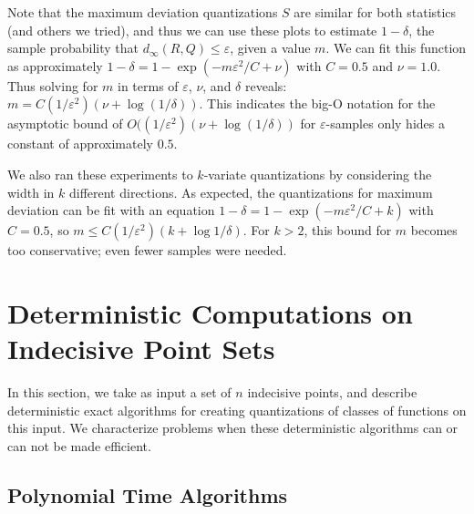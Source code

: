 \documentclass{journal}
\newcommand{\eps}{\varepsilon}
\begin{document}
Note that the maximum deviation quantizations $S$ are similar for both statistics (and others we tried), and thus we can use these plots to estimate $1-\delta$, the sample probability that $d_\infty(R,Q) \leq \eps$, given a value $m$.  We can fit this function as approximately $1-\delta = 1-\exp(-m \eps^2 / C + \nu)$ with $C=0.5$ and $\nu=1.0$.  Thus solving for $m$ in terms of $\eps$, $\nu$, and $\delta$ reveals: $m = C (1/\eps^2) (\nu + \log (1/\delta))$.
This indicates the big-O notation for the asymptotic bound of $O((1/\eps^2) (\nu + \log (1/\delta))$ \cite{LLS01} for $\eps$-samples only hides a constant of approximately $0.5$.

We also ran these experiments to $k$-variate quantizations by considering the width in $k$ different directions.  As expected, the quantizations for maximum deviation can be fit with an equation $1-\delta = 1-\exp(-m\eps^2/C + k)$ with $C=0.5$, so $m \leq C (1/\eps^2)(k + \log 1/\delta)$.  For $k > 2$, this bound for $m$ becomes too conservative; even fewer samples were needed.


































\section {Deterministic Computations on Indecisive Point Sets}
\label {sec:pointsetsets}
  
In this section, we take as input a set of $n$ indecisive points, and describe deterministic exact algorithms for creating quantizations of classes of functions on this input.  We characterize problems when these deterministic algorithms can or can not be made efficient.  

\subsection {Polynomial Time Algorithms}
\label {sec:pta}
\end{document}
